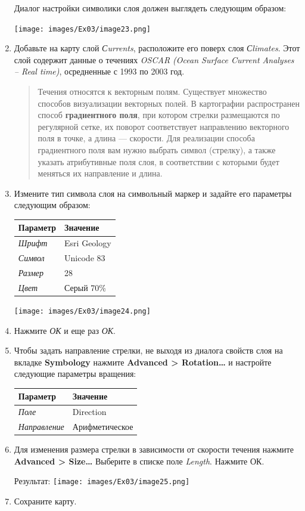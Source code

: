 \documentclass[12pt,]{book}
\begin{document}
\begin{enumerate}
  Диалог настройки символики слоя должен выглядеть следующим образом:

  \texttt{[image: images/Ex03/image23.png]}
\item
  Добавьте на карту слой \emph{Сurrents}, расположите его поверх слоя \emph{Сlimates}. Этот слой содержит данные о течениях \emph{OSCAR (Ocean Surface Current Analyses -- Real time)}, осредненные с 1993 по 2003 год.

  \begin{quote}
  Течения относятся к векторным полям. Существует множество способов визуализации векторных полей. В картографии распространен способ \textbf{градиентного поля}, при котором стрелки размещаются по регулярной сетке, их поворот соответствует направлению векторного поля в точке, а длина --- скорости. Для реализации способа градиентного поля вам нужно выбрать символ (стрелку), а также указать атрибутивные поля слоя, в соответствии с которыми будет меняться их направление и длина.
  \end{quote}
\item
  Измените тип символа слоя на символьный маркер и задайте его параметры следующим образом:

  \begin{longtable}[]{@{}ll@{}}
  \toprule
  \textbf{Параметр} & \textbf{Значение}\tabularnewline
  \midrule
  \endhead
  \emph{Шрифт} & Esri Geology\tabularnewline
  \emph{Символ} & Unicode 83\tabularnewline
  \emph{Размер} & 28\tabularnewline
  \emph{Цвет} & Серый 70\%\tabularnewline
  \bottomrule
  \end{longtable}

  \texttt{[image: images/Ex03/image24.png]}
\item
  Нажмите \emph{ОК} и еще раз \emph{ОК}.
\item
  Чтобы задать направление стрелки, не выходя из диалога свойств слоя на вкладке \textbf{Symbology} нажмите \textbf{Advanced \textgreater{} Rotation\ldots{}} и настройте следующие параметры вращения:

  \begin{longtable}[]{@{}ll@{}}
  \toprule
  \textbf{Параметр} & \textbf{Значение}\tabularnewline
  \midrule
  \endhead
  \emph{Поле} & Direction\tabularnewline
  \emph{Направление} & Арифметическое\tabularnewline
  \bottomrule
  \end{longtable}
\item
  Для изменения размера стрелки в зависимости от скорости течения нажмите \textbf{Advanced \textgreater{} Size\ldots{}} Выберите в списке поле \emph{Length}. Нажмите ОК.

  Результат:
  \texttt{[image: images/Ex03/image25.png]}
\item
  Сохраните карту.
\end{enumerate}
\end{document}
